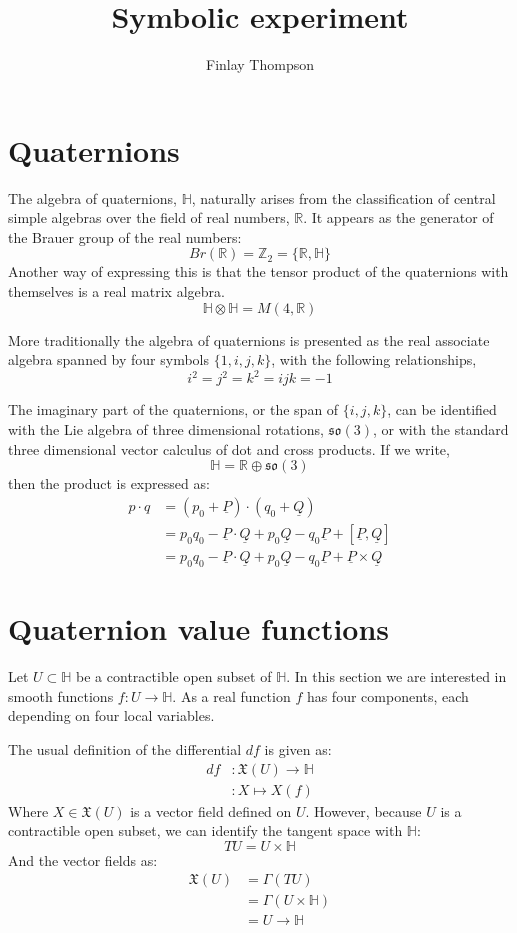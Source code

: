 \documentclass{amsart}
\title{Symbolic experiment}
\author{Finlay Thompson}
\providecommand{\Z}{\mathbb{Z}}
\providecommand{\R}{\mathbb{R}}
\providecommand{\HH}{\mathbb{H}}
\providecommand{\so}{\mathfrak{so}}
\renewcommand{\P}{\underline{P}}
\newcommand{\Q}{\underline{Q}}
\begin{document}
\maketitle

\section{Quaternions}

The algebra of quaternions, $\HH$, naturally arises from the classification of
central simple algebras over the field of real numbers, $\R$. It appears as the
generator of the Brauer group of the real numbers:
$$ Br(\R) = \Z_2 = \{\R, \HH\} $$
Another way of expressing this is that the tensor product of the quaternions
with themselves is a real matrix algebra.
$$ \HH\otimes\HH = M(4, \R) $$

More traditionally the algebra of quaternions is presented as the real associate
algebra spanned by four symbols $\{1,i,j,k\}$, with the following relationships,
$$ i^2 = j ^2 = k^2 = ijk = -1 $$

The imaginary part of the quaternions, or the span of $\{i,j,k\}$, can be
identified with the Lie algebra of three dimensional rotations, $\so(3)$, or
with the standard three dimensional vector calculus of dot and cross products.
If we write,
$$ \HH = \R \oplus \so(3) $$
then the product is expressed as:
\begin{align*}
  p \cdot q &= (p_0 + \P) \cdot (q_0 + \Q) \\
            &= p_0q_0 - \P\cdot \Q + p_0\Q - q_0\P + [\P,\Q] \\
            &= p_0q_0 - \P\cdot \Q + p_0\Q - q_0\P + \P\times \Q
\end{align*}


\section{Quaternion value functions}

Let $U\subset\HH$ be a contractible open subset of $\HH$. In this section we are
interested in smooth functions $f : U \to \HH$. As a real function $f$ has four
components, each depending on four local variables.

The usual definition of the differential $df$ is given as:
\begin{align*}
  df &: \mathfrak{X}(U) \to \HH \\
     &: X \mapsto X(f)
\end{align*}
Where $X \in \mathfrak{X}(U)$ is a vector field defined on $U$. However, because
$U$ is a contractible open subset, we can identify the tangent space with $\HH$:
$$ TU = U \times \HH $$
And the vector fields as:
\begin{align*}
\mathfrak{X}(U)
    &= \Gamma(TU) \\
    &= \Gamma(U \times \HH) \\
    &= U \to \HH
\end{align*}
\end{document}
